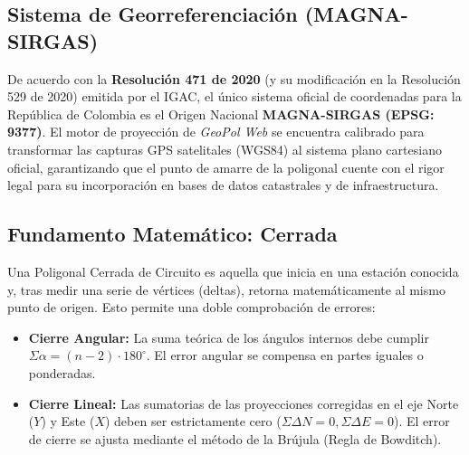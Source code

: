 \documentclass[11pt,letterpaper]{article}
\begin{document}
\subsection{Sistema de Georreferenciación (MAGNA-SIRGAS)}
De acuerdo con la \textbf{Resolución 471 de 2020} (y su modificación en la Resolución 529 de 2020) emitida por el IGAC, el único sistema oficial de coordenadas para la República de Colombia es el Origen Nacional \textbf{MAGNA-SIRGAS (EPSG: 9377)}.
El motor de proyección de \textit{GeoPol Web} se encuentra calibrado para transformar las capturas GPS satelitales (WGS84) al sistema plano cartesiano oficial, garantizando que el punto de amarre de la poligonal cuente con el rigor legal para su incorporación en bases de datos catastrales y de infraestructura.
\subsection{Fundamento Matemático: Cerrada}
Una Poligonal Cerrada de Circuito es aquella que inicia en una estación conocida y, tras medir una serie de vértices (deltas), retorna matemáticamente al mismo punto de origen. Esto permite una doble comprobación de errores:
\begin{itemize}
  \item \textbf{Cierre Angular:} La suma teórica de los ángulos internos debe cumplir $\Sigma \alpha = (n - 2) \cdot 180^\circ$. El error angular se compensa en partes iguales o ponderadas.
  \item \textbf{Cierre Lineal:} Las sumatorias de las proyecciones corregidas en el eje Norte ($Y$) y Este ($X$) deben ser estrictamente cero ($\Sigma \Delta N = 0, \Sigma \Delta E = 0$). El error de cierre se ajusta mediante el método de la Brújula (Regla de Bowditch).
\end{itemize}
\end{document}
